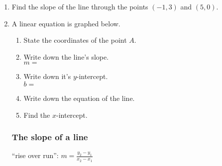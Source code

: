 \begin{enumerate}
\item Find the slope of the line through the points $(-1, 3)$ and $(5, 0)$. \vspace{3cm}

\item A linear equation is graphed below.
\begin{multicols}{2}
\begin{enumerate}
  \item State the coordinates of the point $A$. \vspace{0.25cm}
  \item Write down the line's slope.\\ $m=$
  \vspace{0.25cm}
  \item Write down it's $y$-intercept.\\ $b=$
  \vspace{0.25cm}
  \item Write down the equation of the line.
  \vspace{1cm}
  \item Find the $x$-intercept.
\end{enumerate} \vspace{.5cm}
  \begin{center} 
  \end{center}
\end{multicols} \vspace{1cm}

\newpage
\subsubsection*{The slope of a line}
``rise over run'': $\displaystyle m=\frac{y_2-y_1}{x_2-x_1}$


\end{enumerate}
